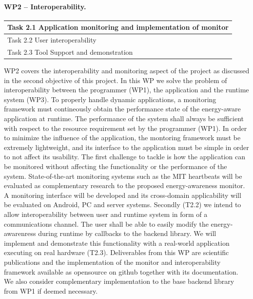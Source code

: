 \documentclass{article}
\begin{document}
\paragraph{WP2 -- Interoperability.}
\begin{table}
\vspace{-0.5cm}
\small
\begin{tabular}{ | l |}
\hline
Task 2.1 Application monitoring and implementation of monitor  \\ \hline
Task 2.2 User interoperability   \\ \hline
Task 2.3 Tool Support and demonstration	\\ \hline
\end{tabular}
\vspace{-0.3cm}
\end{table}
WP2 covers the interoperability and monitoring aspect of the project as discussed in the second objective of this project.
In this WP we solve the problem of interoperability between the programmer (WP1), the application and the runtime system (WP3).
To properly handle dynamic applications, a monitoring framework must contineously obtain the performance state of the energy-aware application at runtime.
The performance of the system shall always be sufficient with respect to the resource requirement set by the programmer (WP1).
In order to minimize the influence of the application, the montoring framework must be extremely lightweight, and its interface to the application must be simple in order to not affect its usability.
The first challenge to tackle is how the application can be monitored without affecting the functionality or the performance of the system.
State-of-the-art monitoring systems such as the MIT heartbeats \cite{Hoffmann:10} will be evaluated as complementary research to the proposed energy-awareness monitor.
A monitoring interface will be developed and its cross-domain applicability will be evaluated on Android, PC and server systems.
Secondly (T2.2) we intend to allow interoperability between user and runtime system in form of a communications channel.
The user shall be able to easily modify the energy-awarenress during runtime by callbacks to the backend library.
We will implement and demonstrate this functionality with a real-world application executing on real hardware (T2.3).
Deliverables from this WP are scientific publications and the implementation of the monitor and interoperability framework available as opensource on github together with its documentation.
We also consider complementary implementation to the base backend library from WP1 if deemed necessary.
\end{document}
